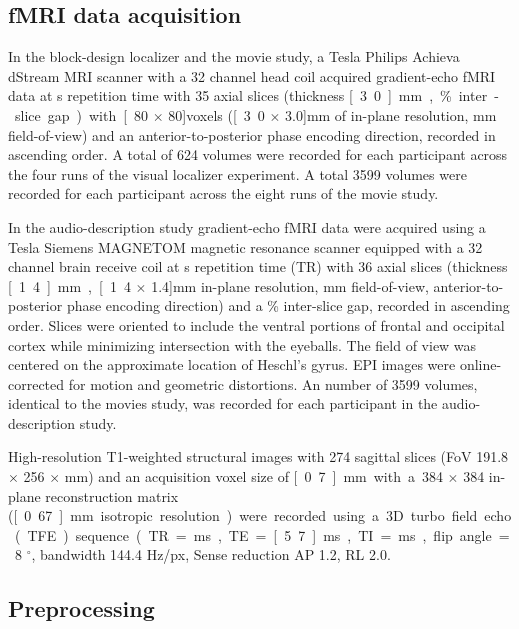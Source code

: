 \subsection{fMRI data acquisition}
%
In the block-design localizer and the movie study, a \unit[3]{Tesla} Philips
Achieva dStream MRI scanner with a 32 channel head coil acquired gradient-echo
fMRI data at \unit[2]{s} repetition time with
35 axial slices (thickness \unit[3.0]{mm}, \unit[10]{\%} inter-slice gap) with
\unit[80 $\times$ 80]{voxels} (\unit[3.0 $\times$ 3.0]{mm} of in-plane
resolution, \unit[240]{mm} field-of-view) and an anterior-to-posterior phase
encoding direction, recorded in ascending order.
A total of 624 volumes were recorded for each participant across the four runs
of the visual localizer experiment.
%
A total 3599 volumes were recorded for each participant across the eight runs of
the movie study.

In the audio-description study gradient-echo fMRI data were acquired using a
\unit[7]{Tesla} Siemens MAGNETOM magnetic resonance scanner equipped with a 32
channel brain receive coil at \unit[2]{s} repetition time (TR) with 36 axial
slices (thickness \unit[1.4]{mm}, \unit[1.4 $\times$ 1.4]{mm} in-plane
resolution, \unit[224]{mm} field-of-view, anterior-to-posterior phase encoding
direction) and a \unit[10]{\%} inter-slice gap, recorded in ascending order.
Slices were oriented to include the ventral portions of frontal and occipital
cortex while minimizing intersection with the eyeballs.
The field of view was centered on the approximate location of Heschl's gyrus.
EPI images were online-corrected for motion and geometric distortions.
%
An number of 3599 volumes, identical to the movies study, was recorded for each
participant in the audio-description study.

%
High-resolution T1-weighted structural images with 274 sagittal slices (FoV
191.8 $\times$ 256 $\times$ \unit[256]{mm}) and an acquisition voxel size of
\unit[0.7]{mm} with a 384 $\times$ 384 in-plane reconstruction matrix
(\unit[0.67]{mm} isotropic resolution) were recorded using a 3D turbo field echo
(TFE) sequence (TR = \unit[2500]{ms}, TE = \unit[5.7]{ms}, TI = \unit[900]{ms},
flip angle = 8 $^{\circ}$, bandwidth 144.4 Hz/px, Sense reduction AP 1.2, RL
2.0.

\subsection{Preprocessing}

